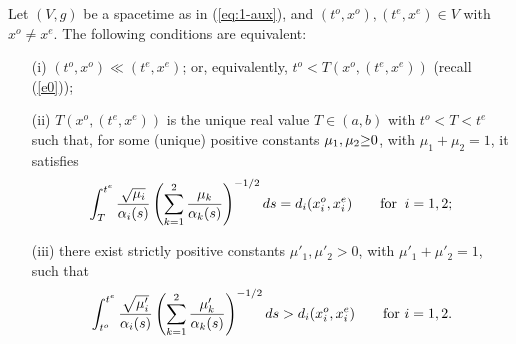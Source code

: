 \begin{prop}\label{c0}
Let $(V,g)$ be a \multiwarped spacetime as in (\ref{eq:1-aux}), and $(t^{o},x^{o}), (t^{e},x^{e})\in V$ with $x^{o}\neq
x^{e}$. The following conditions are equivalent:
\begin{itemize}

\item[(i)]  $(t^{o},x^{o})\ll (t^{e},x^{e})$; or, equivalently, $t^o<T(x^o,(t^e,x^e))$ (recall (\ref{e0}));
\item[(ii)] $T(x^o,(t^e,x^e))$ is the unique real value $T\in (a,b)$
with $t^{o}<T<t^{e}$ such that, for some (unique) positive constants $\mu_{1},\mu_2 {\color{black} \geq}
0$, with $\mu_{1}+\mu_{2}=1$, it satisfies
\begin{equation}\label{ee2}
\int_{T}^{t^{e}} \frac{\sqrt{\mu_{i}}}{\alpha_{i}(s)}\left(\sum_{k=1}^{2} \frac{\mu_{k}}{\alpha_{k}(s)} \right)^{-1/2}ds=d_{i}(x^{o}_{i},x^{e}_{i})\qquad\hbox{for}\;\;
i=1,2;
\end{equation}

\item[(iii)] there exist strictly positive constants $\mu'_{1},\mu'_{2}> 0$, with $\mu'_1+\mu'_2=1$,
such that
\begin{equation}\label{ee2''}
\int_{t^{o}}^{t^{e}} \frac{\sqrt{\mu_{i}'}}{\alpha_{i}(s)}\left(\sum_{k=1}^{2} \frac{\mu_{k}'}{\alpha_{k}(s)} \right)^{-1/2}ds>
d_{i}(x^{o}_{i},x^{e}_{i})\qquad\hbox{for $i=1,2$}.
\end{equation}
\end{itemize}
\end{prop}
